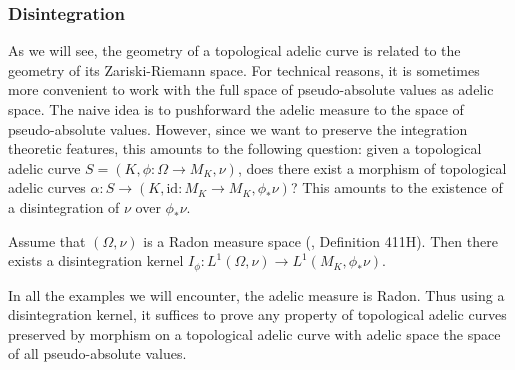 \documentclass [11pt,reqno]{amsart}
\newcommand{\1}{\mathmybb{1}}
\begin{document}
\subsubsection{Disintegration}
\label{subsub:disintegration}

As we will see, the geometry of a topological adelic curve is related to the geometry of its Zariski-Riemann space. For technical reasons, it is sometimes more convenient to work with the full space of pseudo-absolute values as adelic space. The naive idea is to pushforward the adelic measure to the space of pseudo-absolute values. However, since we want to preserve the integration theoretic features, this amounts to the following question: given a topological adelic curve $S=(K,\phi:\Omega\to M_{K},\nu)$, does there exist a morphism of topological adelic curves $\alpha: S \to (K,\mathrm{id}:M_{K}\to M_{K},\phi_{\ast}\nu)$? This amounts to the existence of a disintegration of $\nu$ over $\phi_{\ast}\nu$. 

\begin{proposition}
\label{prop:existence_disintegration}
Assume that $(\Omega,\nu)$ is a Radon measure space (\cite{Fremlin03}, Definition 411H). Then there exists a disintegration kernel $I_{\phi}:L^{1}(\Omega,\nu)\to L^{1}(M_{K},\phi_{\ast}\nu)$. 
\end{proposition}

\begin{remark}
\label{rem:existence_disintegration}
In all the examples we will encounter, the adelic measure is Radon. Thus using a disintegration kernel, it suffices to prove any property of topological adelic curves preserved by morphism on a topological adelic curve with adelic space the space of all pseudo-absolute values.
\end{remark}
\end{document}
